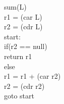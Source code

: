\documentclass[12pt]{article}
\begin{document}
\begin{flushleft}
\qquad sum(L)\\
\qquad \qquad r1 = (car L)\\
\qquad \qquad r2 = (cdr L)\\
\qquad \qquad start:\\
\qquad \qquad \qquad if(r2 == null)\\
\qquad \qquad \qquad \qquad return r1\\
\qquad \qquad \qquad else\\
\qquad \qquad \qquad \qquad r1 = r1 + (car r2)\\
\qquad \qquad \qquad \qquad r2 = (cdr r2)\\
\qquad \qquad \qquad \qquad goto start\\

\end{flushleft}
\end{document}
